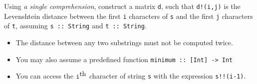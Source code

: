\documentclass[7pt]{article}
\begin{document}
Using \emph{a single comprehension}, construct a matrix \texttt{d},
such that \texttt{d!(i,j)} is the Levenshtein distance between the
first \texttt{i} characters of \texttt{s} and the first \texttt{j}
characters of \texttt{t}, assuming
\texttt{s :: String} and \texttt{t :: String}.

\begin{itemize}
\item The distance between any two substrings must not be computed
  twice.
\item You may also assume a predefined function \texttt{minimum :: [Int] -> Int}
\item You can access the $\mbox{\texttt{i}}^{\mbox{th}}$ character of
  string \texttt{s} with the expression \texttt{s!!(i-1)}.
\end{itemize}
\end{document}
